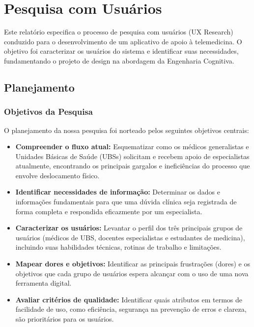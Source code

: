 \documentclass[12pt, a4paper, oneside]{abntex2}
\begin{document}
\chapter{Pesquisa com Usuários}

Este relatório especifica o processo de pesquisa com usuários (UX Research) conduzido para o desenvolvimento de um aplicativo de apoio à telemedicina. O objetivo foi caracterizar os usuários do sistema e identificar suas necessidades, fundamentando o projeto de design na abordagem da Engenharia Cognitiva.

\section{Planejamento}
\label{sec:planejamento}

\subsection{Objetivos da Pesquisa}
O planejamento da nossa pesquisa foi norteado pelos seguintes objetivos centrais:
\begin{itemize}
    \item \textbf{Compreender o fluxo atual:} Esquematizar como os médicos generalistas e Unidades Básicas de Saúde (UBSs) solicitam e recebem apoio de especialistas atualmente, encontrando os principais gargalos e ineficiências do processo que envolve deslocamento físico.
    \item \textbf{Identificar necessidades de informação:} Determinar os dados e informações fundamentais para que uma dúvida clínica seja registrada de forma completa e respondida eficazmente por um especialista.
    \item \textbf{Caracterizar os usuários:} Levantar o perfil dos três principais grupos de usuários (médicos de UBS, docentes especialistas e estudantes de medicina), incluindo suas habilidades técnicas, rotinas de trabalho e limitações.
    \item \textbf{Mapear dores e objetivos:} Identificar as principais frustrações (dores) e os objetivos que cada grupo de usuários espera alcançar com o uso de uma nova ferramenta digital.
    \item \textbf{Avaliar critérios de qualidade:} Identificar quais atributos em termos de facilidade de uso, como eficiência, segurança na prevenção de erros e clareza, são prioritários para os usuários.
\end{itemize}
\end{document}
